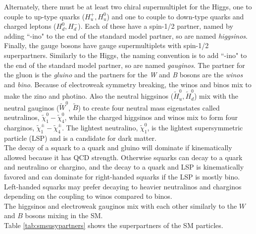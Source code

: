 Alternately, there must be at least two chiral supermultiplet for the Higgs, one to couple to up-type quarks ($H_u^+ , H_u^0$) and one to couple to down-type quarks and charged leptons ($H_d^0, H_d^-$).  Each of these have a spin-1/2 partner, named by adding ``-ino" to the end of the standard model partner, so are named \textit{higgsinos}.  \\

Finally, the gauge bosons  have gauge supermultiplets with spin-1/2 superpartners.  Similarly to the Higgs, the naming convention is to add ``-ino" to the end of the standard model partner, so are named \textit{gauginos}.  The partner for the gluon is the \textit{gluino} and the partners for the \textit{W} and \textit{B} bosons are the \textit{winos} and \textit{bino}.  Because of electroweak symmetry breaking, the winos and binos mix to make the zino and photino.  Also the neutral higgsinos ($\widetilde{H}^0_u,\widetilde{H}^0_d$)  mix with the neutral gauginos ($\widetilde{W}^0$, $\widetilde{B}$) to create four neutral mass eigenstates called neutralinos, $\widetilde{\chi}^0_1-\widetilde{\chi}^0_4$, while the charged higgsinos and winos mix to form four charginos, $\widetilde{\chi}^\pm_1-\widetilde{\chi}^\pm_4$.  The lightest neutralino, $\widetilde{\chi}^0_1$, is the lightest supersymmetric particle (LSP) and is a candidate for dark matter.  \\

The decay of a squark to a quark and gluino will dominate if kinematically allowed because it has QCD strength.  Otherwise squarks can decay to a quark and neutralino or chargino, and the decay to a quark and LSP is kinematically favored and can dominate for right-handed squarks if the LSP is mostly bino.  Left-handed squarks may prefer decaying to heavier neutralinos and charginos depending on the coupling to winos compared to binos.  \\

The higgsinos and electroweak gauginos mix with each other  similarly to the $W$ and $B$ bosons mixing in the SM.   \\

Table \ref{tab:smsusypartners} shows the superpartners of the SM particles.  \\



